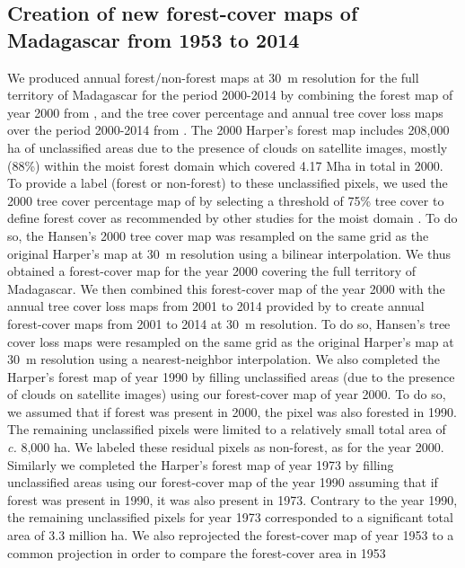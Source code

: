\documentclass[essd, classical]{copernicus}
\begin{document}
\subsection{Creation of new forest-cover maps of Madagascar from
1953 to 2014}

We produced annual forest/non-forest maps at 30~m resolution for the
full territory of Madagascar for the period 2000-2014 by combining the
forest map of year 2000 from \citet{Harper2007}, and the tree cover
percentage and annual tree cover loss maps over the period 2000-2014
from \citet{Hansen2013}. The 2000 Harper's forest map includes 208,000
ha of unclassified areas due to the presence of clouds on satellite
images, mostly (88\%) within the moist forest domain which covered
4.17 Mha in total in 2000. To provide a label (forest or non-forest)
to these unclassified pixels, we used the 2000 tree cover percentage
map of \citet{Hansen2013} by selecting a threshold of 75\% tree cover
to define forest cover as recommended by other studies for the moist
domain \citep{Achard2014, Aleman2017}. To do so, the Hansen's 2000
tree cover map was resampled on the same grid as the original Harper's
map at 30~m resolution using a bilinear interpolation. We thus obtained
a forest-cover map for the year 2000 covering the full territory of
Madagascar. We then combined this forest-cover map of the year 2000
with the annual tree cover loss maps from 2001 to 2014 provided by
\citet{Hansen2013} to create annual forest-cover maps from 2001 to
2014 at 30~m resolution. To do so, Hansen's tree cover loss maps were
resampled on the same grid as the original Harper's map at 30~m
resolution using a nearest-neighbor interpolation. We also completed
the Harper's forest map of year 1990 by filling unclassified areas
(due to the presence of clouds on satellite images) using our
forest-cover map of year 2000. To do so, we assumed that if forest was
present in 2000, the pixel was also forested in 1990. The remaining
unclassified pixels were limited to a relatively small total area of
\emph{c.} 8,000 ha. We labeled these residual pixels as non-forest, as
for the year 2000. Similarly we completed the Harper's forest map of
year 1973 by filling unclassified areas using our forest-cover map of
the year 1990 assuming that if forest was present in 1990, it was also
present in 1973. Contrary to the year 1990, the remaining unclassified
pixels for year 1973 corresponded to a significant total area of 3.3
million ha. We also reprojected the forest-cover map of year 1953 to a
common projection in order to compare the forest-cover area in 1953
\end{document}
